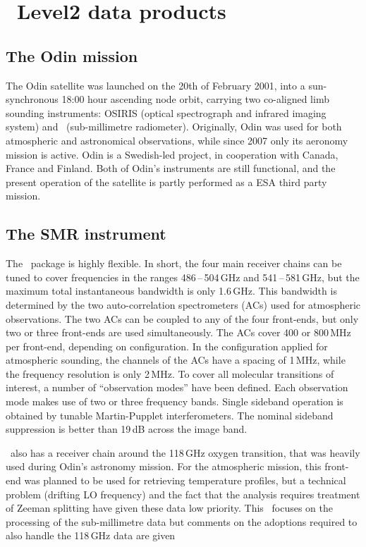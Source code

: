 \chapter{\smr\ Level2 data products}

\section{The Odin mission}
\label{sec:odin}
%

The Odin satellite was launched on the 20th of February 2001, into a sun-synchronous
18:00 hour ascending node orbit, carrying two co-aligned limb sounding
instruments: OSIRIS (optical spectrograph and infrared imaging system) and
\SMR\ (sub-millimetre radiometer). Originally, Odin was used for both
atmospheric and astronomical observations, while since 2007 only its aeronomy
mission is active. Odin is a Swedish-led project, in cooperation with Canada,
France and Finland. Both of Odin's instruments are still functional, and the
present operation of the satellite is partly performed as a ESA third party
mission.

\section{The SMR instrument}

The \smr\ package is highly flexible. In short, the four main receiver chains
can be tuned to cover frequencies in the ranges 486\,--\,504\,GHz and
541\,--\,581\,GHz, but the maximum total instantaneous bandwidth is only
1.6\,GHz. This bandwidth is determined by the two auto-correlation
spectrometers (ACs) used for atmospheric observations. The two ACs can be
coupled to any of the four front-ends, but only two or three front-ends are
used simultaneously. The ACs cover 400 or 800\,MHz per front-end, depending on
configuration. In the configuration applied for atmospheric sounding, the
channels of the ACs have a spacing of 1\,MHz, while the frequency resolution is
only 2\,MHz. To cover all molecular transitions
of interest, a number of ``observation modes'' have been defined. Each
observation mode makes use of two or three frequency bands. Single sideband
operation is obtained by tunable Martin-Pupplet interferometers. The nominal
sideband suppression is better than 19\,dB across the image band.

\smr\ also has a receiver chain around the 118\,GHz oxygen transition, that was
heavily used during Odin's astronomy mission. For the atmospheric mission, this
front-end was planned to be used for retrieving temperature profiles, but a
technical problem (drifting LO frequency) and the fact that the analysis
requires treatment of Zeeman splitting have given these data low priority. This
\ATBD\ focuses on the processing of the sub-millimetre data but comments on the
adoptions required to also handle the 118\,GHz data are given

